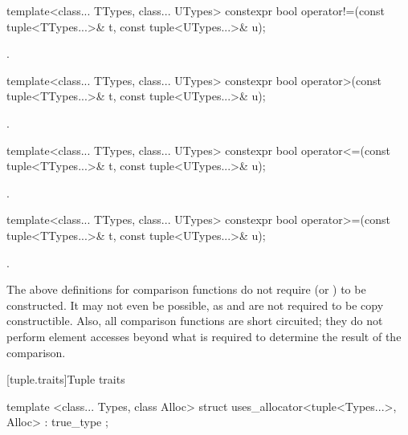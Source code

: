 %
\begin{itemdecl}
template<class... TTypes, class... UTypes>
  constexpr bool operator!=(const tuple<TTypes...>& t, const tuple<UTypes...>& u);
\end{itemdecl}
\begin{itemdescr}
\pnum\returns {}.
\end{itemdescr}

%
\begin{itemdecl}
template<class... TTypes, class... UTypes>
  constexpr bool operator>(const tuple<TTypes...>& t, const tuple<UTypes...>& u);
\end{itemdecl}
\begin{itemdescr}
\pnum\returns {}.
\end{itemdescr}

%
\begin{itemdecl}
template<class... TTypes, class... UTypes>
  constexpr bool operator<=(const tuple<TTypes...>& t, const tuple<UTypes...>& u);
\end{itemdecl}
\begin{itemdescr}
\pnum\returns {}.
\end{itemdescr}

%
\begin{itemdecl}
template<class... TTypes, class... UTypes>
  constexpr bool operator>=(const tuple<TTypes...>& t, const tuple<UTypes...>& u);
\end{itemdecl}

\begin{itemdescr}
\pnum\returns {}.
\end{itemdescr}

\pnum \begin{note} The above definitions for comparison functions
do not require 
(or ) to be constructed. It may not
even be possible, as  and  are not required to be copy
constructible. Also, all comparison functions are short circuited;
they do not perform element accesses beyond what is required to determine the
result of the comparison. \end{note}

[tuple.traits]{Tuple traits}

%
\begin{itemdecl}
template <class... Types, class Alloc>
  struct uses_allocator<tuple<Types...>, Alloc> : true_type { };
\end{itemdecl}

